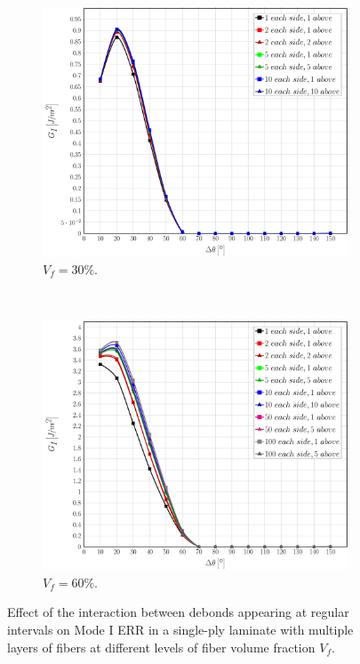 \documentclass[review]{elsarticle}
\begin{document}
\begin{figure}[!h]
\centering
    \begin{subfigure}[b]{0.475\textwidth}
        \includegraphics[width=\textwidth]{sideabovefibers-vf30-GI.pdf}
        \caption{$V_{f}=30\%$.}\label{subfig:sideabovefiber30MI}
    \end{subfigure} ~
    \begin{subfigure}[b]{0.475\textwidth}
        \includegraphics[width=\textwidth]{sideabovefibers-vf60-GI.pdf}
        \caption{$V_{f}=60\%$.}\label{subfig:sideabovefiber60MI}
    \end{subfigure}

\caption{Effect of the interaction between debonds appearing at regular intervals on Mode I ERR in a single-ply laminate with multiple layers of fibers at different levels of fiber volume fraction $V_{f}$.}\label{fig:sideabovefibersMI}
\end{figure}
\end{document}
